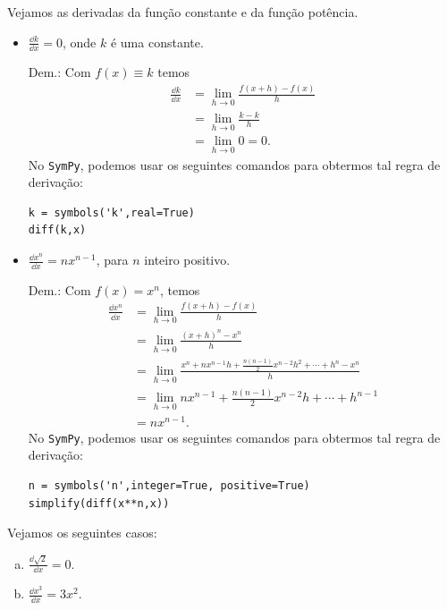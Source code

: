 Vejamos as derivadas da função constante e da função potência.
\begin{itemize}
\item $\displaystyle \frac{\dd k}{\dd x} = 0$, onde $k$ é uma constante.

  Dem.: Com $f(x) \equiv k$ temos
  \begin{align}
    \frac{\dd k}{\dd x} &= \lim_{h\to 0} \frac{f(x+h)-f(x)}{h}\\
                        &= \lim_{h\to 0} \frac{k-k}{h} \\
                        &= \lim_{h\to 0} 0 = 0.
  \end{align}
  \ifispython
  No \verb+SymPy+, podemos usar os seguintes comandos para obtermos tal regra de derivação:
\begin{verbatim}
k = symbols('k',real=True)
diff(k,x)
\end{verbatim}
  \fi
  

\item $\displaystyle \frac{\dd x^n}{\dd x} = nx^{n-1}$, para $n$ inteiro positivo.

  Dem.: Com $f(x) = x^n$, temos
  \begin{align}
    \frac{\dd x^n}{\dd x} &= \lim_{h\to 0} \frac{f(x+h)-f(x)}{h}\\
                          &= \lim_{h\to 0} \frac{(x+h)^n-x^n}{h} \\
                          &= \lim_{h\to 0} \frac{x^n+nx^{n-1}h+\frac{n(n-1)}{2}x^{n-2}h^2 + \cdots +h^n-x^n}{h}\\
                          &= \lim_{h\to 0} nx^{n-1}+\frac{n(n-1)}{2}x^{n-2}h+\cdots+h^{n-1}\\
                          &= nx^{n-1}.
  \end{align}
  \ifispython
  No \verb+SymPy+, podemos usar os seguintes comandos para obtermos tal regra de derivação:
\begin{verbatim}
n = symbols('n',integer=True, positive=True)
simplify(diff(x**n,x))
\end{verbatim}
  \fi
\end{itemize}

\begin{ex}
  Vejamos os seguintes casos:
  \begin{enumerate}[a)]
  \item $\displaystyle \frac{\dd \sqrt{2}}{\dd x} = 0$.
  \item $\displaystyle \frac{\dd x^3}{\dd x} = 3x^2$.
  \end{enumerate}
\end{ex}

